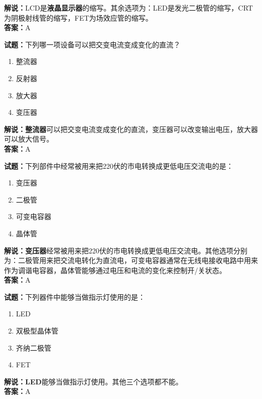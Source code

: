 \documentclass{ctexbook}
\begin{document}
\noindent\textbf{解说：}LCD是\textbf{液晶显示器}的缩写。其余选项为：LED是发光二极管的缩写，CRT为阴极射线管的缩写，FET为场效应管的缩写。\\\noindent\textbf{答案：}A

\bigskip


\noindent\textbf{试题：}下列哪一项设备可以把交变电流变成变化的直流？

\begin{enumerate}[leftmargin=3em]
	\item 整流器
	\item 反射器
	\item 放大器
	\item 变压器
\end{enumerate}

\noindent\textbf{解说：整流器}可以把交变电流变成变化的直流，变压器可以改变输出电压，放大器可以放大信号。\\\noindent\textbf{答案：}A


\bigskip


\noindent\textbf{试题：}下列部件中经常被用来把220伏的市电转换成更低电压交流电的是：

\begin{enumerate}[leftmargin=3em]
	\item 变压器
	\item 二极管
	\item 可变电容器
	\item 晶体管
\end{enumerate}

\noindent\textbf{解说：变压器}经常被用来把220伏的市电转换成更低电压交流电。其他选项分别为：二极管用来把交流电转化为直流电，可变电容器通常在无线电接收电路中用来作为调谐电容器，晶体管能够通过电压和电流的变化来控制开/关状态。\\\noindent\textbf{答案：}A

\bigskip


\noindent\textbf{试题：}下列器件中能够当做指示灯使用的是：

\begin{enumerate}[leftmargin=3em]
	\item LED
	\item 双极型晶体管
	\item 齐纳二极管
	\item FET
\end{enumerate}

\noindent\textbf{解说：LED}能够当做指示灯使用。其他三个选项都不能。\\\noindent\textbf{答案：}A
\end{document}

